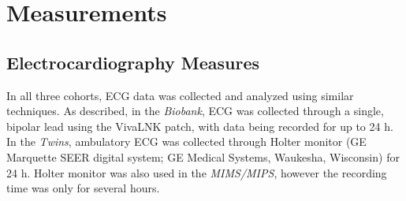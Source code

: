 \documentclass[
  11pt,
  openany]{book}
\begin{document}
\hypertarget{measurements}{%
\section{Measurements}\label{measurements}}

\hypertarget{electrocardiography-measures}{%
\subsection{Electrocardiography Measures}\label{electrocardiography-measures}}

In all three cohorts, ECG data was collected and analyzed using similar techniques. As described, in the \emph{Biobank}, ECG was collected through a single, bipolar lead using the VivaLNK patch, with data being recorded for up to 24 h. In the \emph{Twins}, ambulatory ECG was collected through Holter monitor (GE Marquette SEER digital system; GE Medical Systems, Waukesha, Wisconsin) for 24 h. Holter monitor was also used in the \emph{MIMS/MIPS}, however the recording time was only for several hours.
\end{document}
